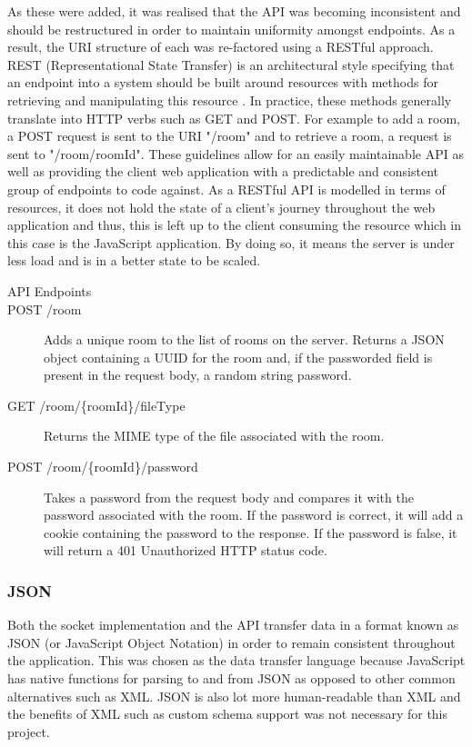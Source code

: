 \documentclass[]{report}
\begin{document}
				As these were added, it was realised that the API was becoming inconsistent and should be restructured in order to maintain uniformity amongst endpoints. As a result, the URI structure of each was re-factored using a RESTful approach. REST (Representational State Transfer) is an architectural style specifying that an endpoint into a system should be built around resources with methods for retrieving and manipulating this resource \cite{REST}. In practice, these methods generally translate into HTTP verbs such as GET and POST. For example to add a room, a POST request is sent to the URI "/room" and to retrieve a room, a request is sent to "/room/{roomId}". These guidelines allow for an easily maintainable API as well as providing the client web application with a predictable and consistent group of endpoints to code against. As a RESTful API is modelled in terms of resources, it does not hold the state of a client's journey throughout the web application and thus, this is left up to the client consuming the resource which in this case is the JavaScript application. By doing so, it means the server is under less load and is in a better state to be scaled.
				
				\begin{description}
					\item [API Endpoints]
				
					\item[POST /room] 
					Adds a unique room to the list of rooms on the server. Returns a JSON object containing a UUID for the room and, if the passworded field is present in the request body, a random string password.
						
					\item[GET /room/\{roomId\}/fileType] 
					Returns the MIME type of the file associated with the room.
					
					\item[POST /room/\{roomId\}/password] 
					Takes a password from the request body and compares it with the password associated with the room. If the password is correct, it will add a cookie containing the password to the response. If the password is false, it will return a 401 Unauthorized HTTP status code.
					
				\end{description}
				
				\subsubsection{JSON}
				Both the socket implementation and the API transfer data in a format known as JSON (or JavaScript Object Notation) in order to remain consistent throughout the application. This was chosen as the data transfer language because JavaScript has native functions for parsing to and from JSON as opposed to other common alternatives such as XML. JSON is also lot more human-readable than XML and the benefits of XML such as custom schema support was not necessary for this project.
		
\end{document}
